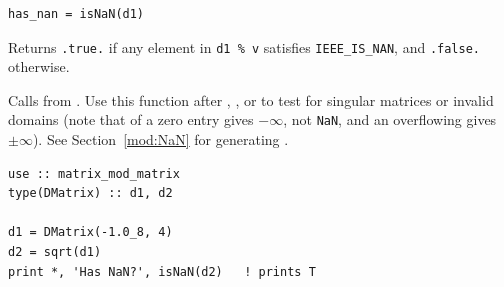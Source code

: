 \lstset{language=[95]Fortran}
\begin{lstlisting}
has_nan = isNaN(d1)
\end{lstlisting}

Returns \texttt{.true.} if any element in \texttt{d1 \% v} satisfies \texttt{IEEE\_IS\_NAN}, and \texttt{.false.} otherwise.

Calls  from . Use this function after , , or  to test for singular matrices or invalid domains (note that  of a zero entry gives $-\infty$, not \texttt{NaN}, and an overflowing  gives $\pm\infty$). See Section~\ref{mod:NaN} for generating .

\begin{description}[leftmargin=2.2cm, style=nextline]
\end{description}

\lstset{language=[95]Fortran}
\begin{lstlisting}
use :: matrix_mod_matrix
type(DMatrix) :: d1, d2

d1 = DMatrix(-1.0_8, 4)
d2 = sqrt(d1)
print *, 'Has NaN?', isNaN(d2)   ! prints T
\end{lstlisting}
